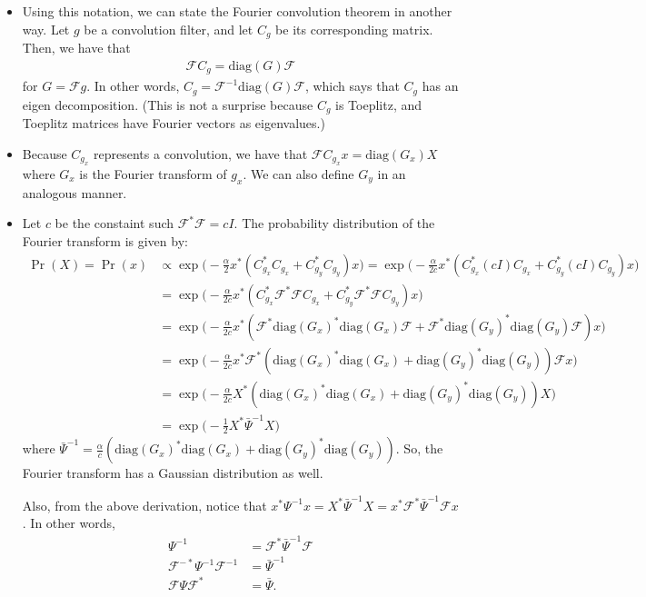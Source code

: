 \documentclass[10pt]{article}
\newcommand{\diag}{\mathrm{diag}}
\begin{document}
\begin{itemize}
  \item Using this notation, we can state the Fourier convolution theorem in another way. Let $g$ be a convolution filter, and let $C_g$ be its corresponding matrix. Then, we have that
  \begin{align*}
    \mathcal{F} C_g = \diag(G) \mathcal{F}
  \end{align*}
  for $G = \mathcal{F}g$. In other words, $C_g = \mathcal{F}^{-1} \diag(G) \mathcal{F}$, which says that $C_g$ has an eigen decomposition. (This is not a surprise because $C_g$ is Toeplitz, and Toeplitz matrices have Fourier vectors as eigenvalues.)
  
  \item Because $C_{g_x}$ represents a convolution, we have that $\mathcal{F} C_{g_x} x = \diag(G_x) X$ where $G_x$ is the Fourier transform of $g_x$. We can also define $G_y$ in an analogous manner.
  
  \item Let $c$ be the constaint such $\mathcal{F}^* \mathcal{F} = cI.$ The probability distribution of the Fourier transform is given by:
  \begin{align*}
    \Pr(X) = \Pr(x) 
    &\propto \exp\bigg( -\frac{\alpha}{2} x^* (C_{g_x}^* C_{g_x} + C_{g_y}^* C_{g_y})x \bigg)
    = \exp\bigg( -\frac{\alpha}{2 c} x^* (C_{g_x}^*(cI)C_{g_x} + C_{g_y}^* (cI) C_{g_y})x \bigg)\\
    &= \exp\bigg( -\frac{\alpha}{2 c} x^* (C_{g_x}^* \mathcal{F}^* \mathcal{F} C_{g_x} + C_{g_y}^* \mathcal{F}^* \mathcal{F} C_{g_y})x \bigg)\\
    &= \exp\bigg( -\frac{\alpha}{2 c} x^* (\mathcal{F}^*\diag(G_x)^* \diag(G_x) \mathcal{F} + \mathcal{F}^* \diag(G_y)^* \diag(G_y) \mathcal{F}) x \bigg)\\
    &= \exp\bigg( -\frac{\alpha}{2 c} x^* \mathcal{F}^* (\diag(G_x)^* \diag(G_x) + \diag(G_y)^* \diag(G_y) ) \mathcal{F} x \bigg)\\
    &= \exp\bigg( -\frac{\alpha}{2 c} X^* (\diag(G_x)^* \diag(G_x) + \diag(G_y)^* \diag(G_y)) X \bigg)\\
    &= \exp\bigg( -\frac{1}{2} X^* \bar{\Psi}^{-1} X \bigg)
  \end{align*}
  where $\bar{\Psi}^{-1} = \frac{\alpha}{c} (\diag(G_x)^* \diag(G_x) + \diag(G_y)^* \diag(G_y)).$ So, the Fourier transform has a Gaussian distribution as well.
  
  Also, from the above derivation, notice that $x^* \Psi^{-1} x = X^* \bar{\Psi}^{-1} X = x^* \mathcal{F}^* \bar{\Psi}^{-1} \mathcal{F}  x $. In other words, 
  \begin{align*}
    \Psi^{-1} &= \mathcal{F}^* \bar{\Psi}^{-1} \mathcal{F}\\
    \mathcal{F}^{-*} \Psi^{-1} \mathcal{F}^{-1} &= \bar{\Psi}^{-1}\\  
    \mathcal{F} \Psi \mathcal{F}^* &= \bar{\Psi}.
  \end{align*}
    

\end{itemize}
\end{document}
